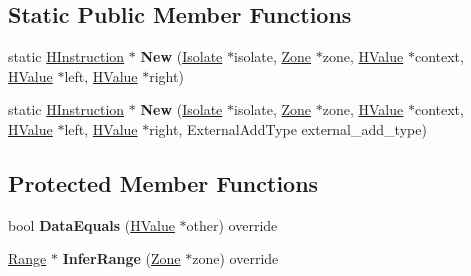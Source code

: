 \subsection*{Static Public Member Functions}
\begin{DoxyCompactItemize}
\item 
static \hyperlink{classv8_1_1internal_1_1_h_instruction}{H\+Instruction} $\ast$ {\bfseries New} (\hyperlink{classv8_1_1internal_1_1_isolate}{Isolate} $\ast$isolate, \hyperlink{classv8_1_1internal_1_1_zone}{Zone} $\ast$zone, \hyperlink{classv8_1_1internal_1_1_h_value}{H\+Value} $\ast$context, \hyperlink{classv8_1_1internal_1_1_h_value}{H\+Value} $\ast$left, \hyperlink{classv8_1_1internal_1_1_h_value}{H\+Value} $\ast$right)\hypertarget{classv8_1_1internal_1_1_h_add_aebadb162a1ad88ab2b2d5193b8b16896}{}\label{classv8_1_1internal_1_1_h_add_aebadb162a1ad88ab2b2d5193b8b16896}

\item 
static \hyperlink{classv8_1_1internal_1_1_h_instruction}{H\+Instruction} $\ast$ {\bfseries New} (\hyperlink{classv8_1_1internal_1_1_isolate}{Isolate} $\ast$isolate, \hyperlink{classv8_1_1internal_1_1_zone}{Zone} $\ast$zone, \hyperlink{classv8_1_1internal_1_1_h_value}{H\+Value} $\ast$context, \hyperlink{classv8_1_1internal_1_1_h_value}{H\+Value} $\ast$left, \hyperlink{classv8_1_1internal_1_1_h_value}{H\+Value} $\ast$right, External\+Add\+Type external\+\_\+add\+\_\+type)\hypertarget{classv8_1_1internal_1_1_h_add_a47475e77ace214d807686d29a018cc2f}{}\label{classv8_1_1internal_1_1_h_add_a47475e77ace214d807686d29a018cc2f}

\end{DoxyCompactItemize}
\subsection*{Protected Member Functions}
\begin{DoxyCompactItemize}
\item 
bool {\bfseries Data\+Equals} (\hyperlink{classv8_1_1internal_1_1_h_value}{H\+Value} $\ast$other) override\hypertarget{classv8_1_1internal_1_1_h_add_a2d9ac907add0f8bf38b86db41e1050b7}{}\label{classv8_1_1internal_1_1_h_add_a2d9ac907add0f8bf38b86db41e1050b7}

\item 
\hyperlink{classv8_1_1internal_1_1_range}{Range} $\ast$ {\bfseries Infer\+Range} (\hyperlink{classv8_1_1internal_1_1_zone}{Zone} $\ast$zone) override\hypertarget{classv8_1_1internal_1_1_h_add_aa5494d6ae5aa9d396005538fd14244b1}{}\label{classv8_1_1internal_1_1_h_add_aa5494d6ae5aa9d396005538fd14244b1}

\end{DoxyCompactItemize}
